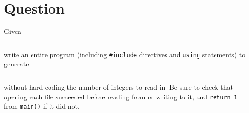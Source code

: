 




\docCopyright


\newEvenPage

\section{Question}


Given

\inputminted[label={file-io-input.txt}]{text}{\docCodeDir/file-io-input.txt}

write an entire program (including \texttt{#include} directives and
\texttt{using} statements) to generate

\inputminted[label={file-io-output.gen.txt}]{text}{\docCodeDir/file-io-output.gen.txt}

without hard coding the number of integers to read in.  Be sure to check that
opening each file succeeded before reading from or writing to it, and
\texttt{return 1} from \texttt{main()} if it did not.

\newpage

\textQuestion{\makePageQuadrilleRuled}



